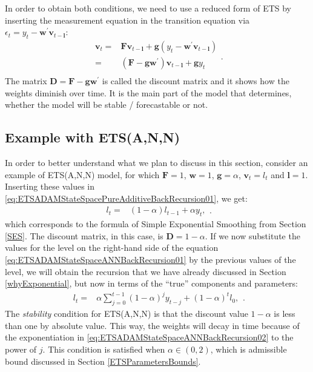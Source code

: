 \documentclass[
]{book}
\theoremstyle{definition}
\theoremstyle{definition}
\theoremstyle{definition}
\theoremstyle{definition}
\theoremstyle{remark}
\begin{document}
In order to obtain both conditions, we need to use a reduced form of ETS by inserting the measurement equation in the transition equation via \(\epsilon_t= {y}_{t} -\mathbf{w}^\prime \mathbf{v}_{t-\mathbf{l}}\):
\begin{equation}
  \begin{aligned}
    \mathbf{v}_{t} = &\mathbf{F} \mathbf{v}_{t-\mathbf{l}} + \mathbf{g} \left({y}_{t} -\mathbf{w}^\prime \mathbf{v}_{t-\mathbf{l}} \right)\\
    = & \left(\mathbf{F} -\mathbf{g}\mathbf{w}^\prime \right) \mathbf{v}_{t-\mathbf{l}} + \mathbf{g} {y}_{t} \\
  \end{aligned}.
  \label{eq:ETSADAMStateSpacePureAdditiveBackRecursion01}
\end{equation}
The matrix \(\mathbf{D}=\mathbf{F} -\mathbf{g}\mathbf{w}^\prime\) is called the discount matrix and it shows how the weights diminish over time. It is the main part of the model that determines, whether the model will be stable / forecastable or not.

\hypertarget{example-with-etsann-1}{%
\subsection{Example with ETS(A,N,N)}\label{example-with-etsann-1}}

In order to better understand what we plan to discuss in this section, consider an example of ETS(A,N,N) model, for which \(\mathbf{F}=1\), \(\mathbf{w}=1\), \(\mathbf{g}=\alpha\), \(\mathbf{v}_t=l_t\) and \(\mathbf{l}=1\). Inserting these values in \eqref{eq:ETSADAMStateSpacePureAdditiveBackRecursion01}, we get:
\begin{equation}
  \begin{aligned}
    l_{t} = & \left(1 -\alpha \right) {l}_{t-1} + \alpha {y}_{t},
  \end{aligned}.
  \label{eq:ETSADAMStateSpaceANNBackRecursion01}
\end{equation}
which corresponds to the formula of Simple Exponential Smoothing from Section \ref{SES}. The discount matrix, in this case, is \(\mathbf{D}=1-\alpha\). If we now substitute the values for the level on the right-hand side of the equation \eqref{eq:ETSADAMStateSpaceANNBackRecursion01} by the previous values of the level, we will obtain the recursion that we have already discussed in Section \ref{whyExponential}, but now in terms of the ``true'' components and parameters:
\begin{equation}
  \begin{aligned}
    l_{t} = & {\alpha} \sum_{j=0}^{t-1} (1 -{\alpha})^j {y}_{t-j} + (1 -{\alpha})^t l_0,
  \end{aligned}.
  \label{eq:ETSADAMStateSpaceANNBackRecursion02}
\end{equation}
The \emph{stability} condition for ETS(A,N,N) is that the discount value \(1-\alpha\) is less than one by absolute value. This way, the weights will decay in time because of the exponentiation in \eqref{eq:ETSADAMStateSpaceANNBackRecursion02} to the power of \(j\). This condition is satisfied when \(\alpha \in(0, 2)\), which is admissible bound discussed in Section \ref{ETSParametersBounds}.
\end{document}
